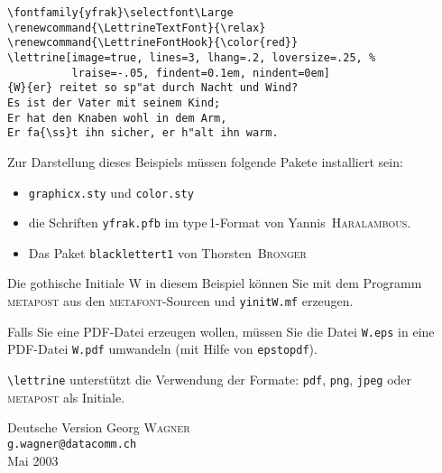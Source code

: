 \documentclass[12pt,a4paper]{article}
\newcommand{\MF}{{\small\sffamily\scshape metafont}}
\newcommand{\MP}{{\small\sffamily\scshape metapost}}
\begin{document}
\begin{verbatim}
\fontfamily{yfrak}\selectfont\Large
\renewcommand{\LettrineTextFont}{\relax}
\renewcommand{\LettrineFontHook}{\color{red}}
\lettrine[image=true, lines=3, lhang=.2, loversize=.25, %
          lraise=-.05, findent=0.1em, nindent=0em]
{W}{er} reitet so sp"at durch Nacht und Wind?
Es ist der Vater mit seinem Kind;
Er hat den Knaben wohl in dem Arm,
Er fa{\ss}t ihn sicher, er h"alt ihn warm.
\end{verbatim}

Zur Darstellung dieses Beispiels m\"ussen folgende Pakete installiert sein:
\begin{itemize}
\item \verb+graphicx.sty+ und \verb+color.sty+
\item die Schriften \verb+yfrak.pfb+ im type\,1-Format
   von Yannis~\textsc{Haralambous}.
\item Das Paket \verb+blacklettert1+ von Thorsten~\textsc{Bronger}
\end{itemize}

Die gothische Initiale \glqq W\grqq{} in diesem Beispiel k\"onnen Sie mit dem
Programm \MP{} aus den \MF{}-Sourcen und \verb+yinitW.mf+ erzeugen.

Falls Sie eine PDF-Datei erzeugen wollen, m\"ussen Sie die Datei \verb+W.eps+
in eine PDF-Datei \verb+W.pdf+ umwandeln (mit Hilfe von \verb+epstopdf+).

\verb+\lettrine+ unterst\"utzt die Verwendung der Formate:
\texttt{pdf}, \texttt{png}, \texttt{jpeg} oder \MP{} als Initiale.

\vfill
\begin{flushright}
  Deutsche Version Georg \textsc{Wagner}\\
  \texttt{g.wagner@datacomm.ch}\\
  Mai 2003
\end{flushright}
\end{document}
